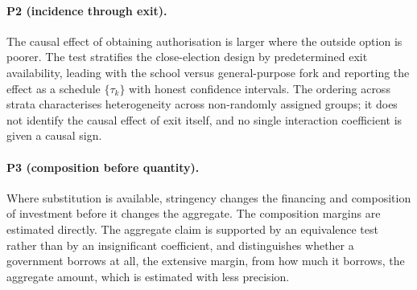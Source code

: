 \paragraph{P2 (incidence through exit).}
The causal effect of obtaining authorisation is larger where the outside option
is poorer. The test stratifies the close-election design by predetermined exit
availability, leading with the school versus general-purpose fork and reporting
the effect as a schedule $\{\tau_k\}$ with honest confidence intervals. The
ordering across strata characterises heterogeneity across non-randomly assigned
groups; it does not identify the causal effect of exit itself, and no single
interaction coefficient is given a causal sign.

\paragraph{P3 (composition before quantity).}
Where substitution is available, stringency changes the financing and
composition of investment before it changes the aggregate. The composition
margins are estimated directly. The aggregate claim is supported by an
equivalence test rather than by an insignificant coefficient, and distinguishes
whether a government borrows at all, the extensive margin, from how much it
borrows, the aggregate amount, which is estimated with less precision.
